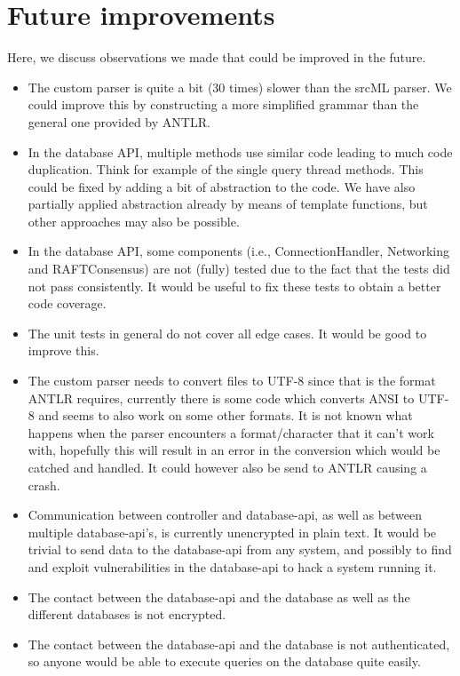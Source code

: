 \documentclass[./Main.tex]{subfiles}
\begin{document}
\section{Future improvements}
Here, we discuss observations we made that could be improved in the future.

\begin{itemize}
    \item The custom parser is quite a bit (30 times) slower than the srcML parser. We could improve this by constructing a more simplified grammar than the general one provided by ANTLR.
    \item In the database API, multiple methods use similar code leading to much code duplication. Think for example of the single query thread methods. This could be fixed by adding a bit of abstraction to the code. We have also partially applied abstraction already by means of template functions, but other approaches may also be possible.
    \item In the database API, some components (i.e., ConnectionHandler, Networking and RAFTConsensus) are not (fully) tested due to the fact that the tests did not pass consistently. It would be useful to fix these tests to obtain a better code coverage.
    \item The unit tests in general do not cover all edge cases. It would be good to improve this.
    \item The custom parser needs to convert files to UTF-8 since that is the format ANTLR requires, currently there is some code which converts ANSI to UTF-8 and seems to also work on some other formats. It is not known what happens when the parser encounters a format/character that it can't work with, hopefully this will result in an error in the conversion which would be catched and handled. It could however also be send to ANTLR causing a crash.
    \item Communication between controller and database-api, as well as between multiple database-api's, is currently unencrypted in plain text. It would be trivial to send data to the database-api from any system, and possibly to find and exploit vulnerabilities in the database-api to hack a system running it.
    \item The contact between the database-api and the database as well as the different databases is not encrypted.
    \item The contact between the database-api and the database is not authenticated, so anyone would be able to execute queries on the database quite easily.

\end{itemize}
\end{document}

